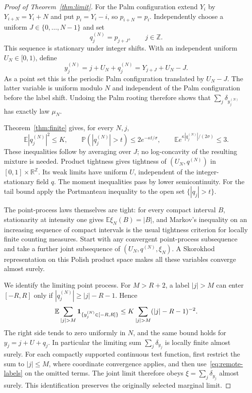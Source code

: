 \documentclass[11pt]{article}
\theoremstyle{remark}\newtheorem{remark}[theorem]{Remark}
\newcommand{\E}{\mathbb E}
\newcommand{\Prob}{\mathbb P}
\newcommand{\R}{\mathbb R}
\newcommand{\Z}{\mathbb Z}
\begin{document}
\begin{proof}[Proof of Theorem~\ref{thm:limit}]
For the Palm configuration extend $Y_i$ by $Y_{i+N}=Y_i+N$ and
put $p_i=Y_i-i$, so $p_{i+N}=p_i$. Independently choose a uniform
$J\in\{0,\ldots,N-1\}$ and set
\[
 q_j^{(N)}=p_{j+J},\qquad j\in\Z.
\]
This sequence is stationary under integer shifts. With an independent
uniform $U_N\in[0,1)$, define
\[
 y_j^{(N)}=j+U_N+q_j^{(N)}
          =Y_{j+J}+U_N-J.
\]
As a point set this is the periodic Palm configuration translated by
$U_N-J$. The latter variable is uniform modulo $N$ and independent
of the Palm configuration before the label shift. Undoing the Palm
rooting therefore shows that $\sum_j\delta_{y_j^{(N)}}$ has exactly
law $\mu_N$.

Theorem~\ref{thm:finite} gives, for every $N,j$,
\begin{equation}\label{eq:uniform-q}
 \E|q_j^{(N)}|^2\le K,\qquad
 \Prob(|q_j^{(N)}|>t)\le2e^{-\kappa t/\sigma},\qquad
 \E e^{\kappa|q_j^{(N)}|/(2\sigma)}\le3.
\end{equation}
These inequalities follow by averaging over $J$; no log-concavity
of the resulting mixture is needed. Product tightness gives tightness
of $(U_N,q^{(N)})$ in $[0,1]\times\R^{\Z}$. Its weak limits have
uniform $U$, independent of the integer-stationary field $q$.
The moment inequalities pass by lower semicontinuity. For the tail
bound apply the Portmanteau inequality to the open set
$\{|q_j|>t\}$.

The point-process laws themselves are tight: for every compact
interval $B$, stationarity at intensity one gives
$\E\xi_N(B)=|B|$, and Markov's inequality on an increasing sequence
of compact intervals is the usual tightness criterion for locally
finite counting measures. Start with any convergent point-process
subsequence and take a further joint subsequence of
$(U_N,q^{(N)},\xi_N)$. A Skorokhod representation on this Polish
product space makes all these variables converge almost surely.

We identify the limiting point process. For $M>R+2$, a label
$|j|>M$ can enter $[-R,R]$ only if
$|q_j^{(N)}|\ge |j|-R-1$. Hence
\begin{equation}\label{eq:remote-labels}
 \E\sum_{|j|>M}{\bf1}_{\{y_j^{(N)}\in[-R,R]\}}
 \le K\sum_{|j|>M}(|j|-R-1)^{-2}.
\end{equation}
The right side tends to zero uniformly in $N$, and the same bound
holds for $y_j=j+U+q_j$. In particular the limiting sum
$\sum_j\delta_{y_j}$ is locally finite almost surely. For each
compactly supported continuous test function, first restrict the
sum to $|j|\le M$, where coordinate convergence applies, and then
use~\eqref{eq:remote-labels} on the omitted terms. The joint limit
therefore obeys $\xi=\sum_j\delta_{y_j}$ almost surely. This
identification preserves the originally selected marginal limit.


\end{proof}
\end{document}
